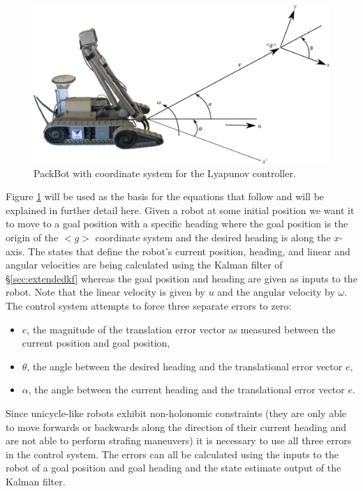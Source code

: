 \begin{figure}[ht!]
	\centering
	\includegraphics[width=.95\textwidth]{images/packbotlyapunov}
	\caption{PackBot with coordinate system for the Lyapunov controller.}
	\label{fig:pblyapunov}
\end{figure}

Figure \ref{fig:pblyapunov} will be used as the basis for the equations that follow and will be explained in further detail here. Given a robot at some initial position we want it to move to a goal position with a specific heading where the goal position is the origin of the $<g>$ coordinate system and the desired heading is along the $x$-axis. The states that define the robot's current position, heading, and linear and angular velocities are being calculated using the Kalman filter of \S\ref{sec:extendedkf} whereas the goal position and heading are given as inputs to the robot. Note that the linear velocity is given by $u$ and the angular velocity by $\omega$. The control system attempts to force three separate errors to zero:
\begin{itemize}
\item $e$, the magnitude of the translation error vector as measured between the current position and goal position,
\item $\theta$, the angle between the desired heading and the translational error vector $e$,
\item $\alpha$, the angle between the current heading and the translational error vector $e$.
\end{itemize}

Since unicycle-like robots exhibit non-holonomic constraints (they are only able to move forwards or backwards along the direction of their current heading and are not able to perform strafing maneuvers) it is necessary to use all three errors in the control system. The errors can all be calculated using the inputs to the robot of a goal position and goal heading and the state estimate output of the Kalman filter.

